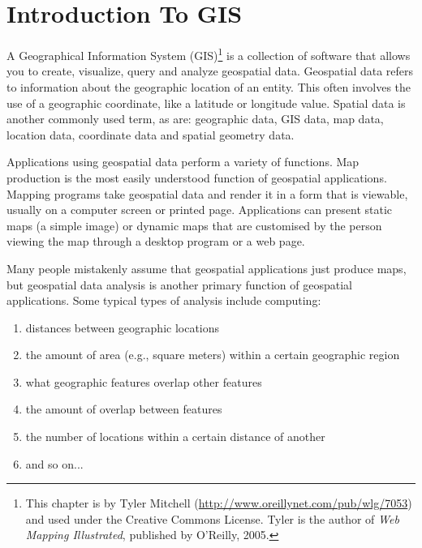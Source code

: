 \pagestyle{scrheadings}
\chapter{Introduction To GIS}\label{label_intro}


A Geographical Information System (GIS)\cite{mitchel05}\footnote{This chapter is by Tyler
Mitchell (\url{http://www.oreillynet.com/pub/wlg/7053}) and
used under the Creative Commons License. Tyler is the author of 
\textit{Web Mapping Illustrated}, published by O'Reilly, 2005.}
is a collection of software that allows you to create, visualize, query and
analyze geospatial data. Geospatial data refers to information about the
geographic location of an entity. This often involves the use of a
geographic coordinate, like a latitude or longitude value. Spatial data is
another commonly used term, as are: geographic data, GIS data, map data,
location data, coordinate data and spatial geometry data.

Applications using geospatial data perform a variety of functions. Map
production is the most easily understood function of geospatial
applications. Mapping programs take geospatial data and render it in a form
that is viewable, usually on a computer screen or printed page.
Applications can present static maps (a simple image) or dynamic maps that
are customised by the person viewing the map through a desktop program or a
web page.

Many people mistakenly assume that geospatial applications just produce
maps, but geospatial data analysis is another primary function of
geospatial applications. Some typical types of analysis include computing:

\begin{enumerate}
\item distances between geographic locations
\item the amount of area (e.g., square meters) within a certain geographic
region
\item what geographic features overlap other features
\item the amount of overlap between features
\item the number of locations within a certain distance of another
\item and so on...
\end{enumerate}

